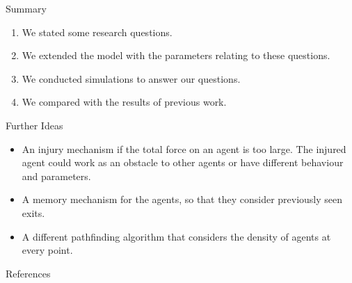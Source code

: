 \documentclass[aspectratio=43]{beamer}
\begin{document}
\begin{frame}{Summary}
	\begin{enumerate}
		\item We stated some research questions. \\
		\bigskip
		\item We extended the model with the parameters relating to these questions. \\
		\bigskip
		\item We conducted simulations to answer our questions. \\
		\bigskip
		\item We compared with the results of previous work.
	\end{enumerate}
\end{frame}


\begin{frame}{Further Ideas}
	\begin{itemize}
		\item An injury mechanism if the total force on an agent is too large. The injured agent could work as an obstacle to other agents or have different behaviour and parameters. \\
		\bigskip
		\item A memory mechanism for the agents, so that they consider previously seen exits. \\
		\bigskip
		\item A different pathfinding algorithm that considers the density of agents at every point.
	\end{itemize}
\end{frame}


\begin{frame}{References}
	
\end{frame}


\begin{inverseframe}
\end{inverseframe}
\end{document}
